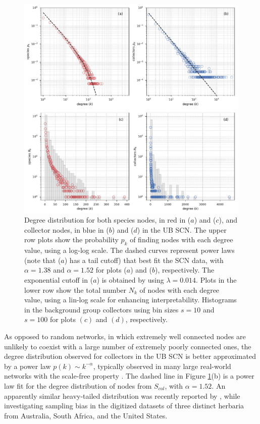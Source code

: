   \begin{figure}[t]
  	\centering
    \includegraphics[width=\linewidth]{figures/casestudy_ub/scn_degree_dist}
    \caption[Degree distribution for both species and collectors nodes in the UB SCN]{Degree distribution for both species nodes, in red in ($a$) and ($c$), and collector nodes, in blue in ($b$) and ($d$) in the UB SCN. The upper row plots show the probability $p_k$ of finding nodes with each degree value, using a log-log scale. The dashed curves represent power laws (note that ($a$) has a tail cutoff) that best fit the SCN data, with $\alpha=1.38$ and $\alpha=1.52$ for plots ($a$) and ($b$), respectively. The exponential cutoff in ($a$) is obtained by using $\lambda=0.014$. Plots in the lower row show the total number $N_k$ of nodes with each degree value, using a lin-log scale for enhancing interpretability. Histograms in the background group collectors using bin sizes $s=10$ and $s=100$ for plots $(c)$ and $(d)$, respectively.}
    \label{fig:ub_scn_degree_dist}
  \end{figure}

As opposed to random networks, in which extremely well connected nodes are unlikely to coexist with a large number of extremely poorly connected ones, the degree distribution observed for collectors in the UB SCN is better approximated by a power law $p(k) \sim k^{-\alpha}$, typically observed in many large real-world networks with the scale-free property \cite{Barabasi1999a}. 
The dashed line in Figure \ref{fig:ub_scn_degree_dist}(b) is a power law fit for the degree distribution of nodes from $S_{col}$, with $\alpha=1.52$. 
An apparently similar heavy-tailed distribution was recently reported by , while investigating sampling bias in the digitized datasets of three distinct herbaria from Australia, South Africa, and the United States.
  
